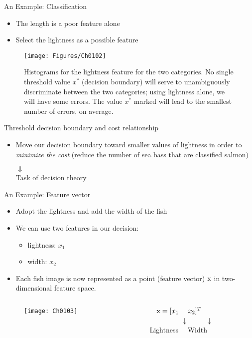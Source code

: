 \begin{frame}{An Example: Classification}
\begin{itemize}
\item The length is a poor feature alone
\item Select the lightness as a possible feature
\end{itemize}
\begin{figure}
\texttt{[image: Figures/Ch0102]}
\caption{Histograms for the lightness feature for the two categories. No single threshold value $x^*$ (decision boundary) will serve to unambiguously discriminate between the two categories; using lightness alone, we will have some errors. The value $x^*$  marked will lead to the smallest number of errors, on average.}
\end{figure}
\end{frame}

\begin{frame}{Threshold decision boundary and cost relationship}
\begin{itemize}
\item Move our decision boundary toward smaller values of lightness in order to \textit{\color{mycolor2}minimize the cost} (reduce the number of sea bass that are classified salmon)\\
\vspace{14pt}
\begin{center}
{\Huge $\Downarrow$}\\
\vspace{14pt}
Task of decision theory
\end{center}
\end{itemize}
\end{frame}

\begin{frame}{An Example: Feature vector}
\begin{itemize}
\item Adopt the lightness and add the width of the fish
\item We can use two features in our decision:
\begin{itemize}
\item lightness: $x_1$
\item width: $x_2$
\end{itemize}
\item Each fish image is now represented as a point ({\color{mycolor2}feature vector}) ${\rm x}$ in two-dimensional  {\color{mycolor2}feature space}.
\end{itemize}
\vspace{-0.5cm}
\begin{columns}
\begin{column}{6cm}
\begin{figure}
\texttt{[image: Ch0103]}
\end{figure}
\end{column}
\begin{column}{4cm}
$~~~{\rm x}=[x_1~~~~x_2]^T$\\
~~~~~~~~~$\downarrow$~~~~~$\downarrow$\\
Lightness~~ Width
\end{column}
\end{columns}
\end{frame}


